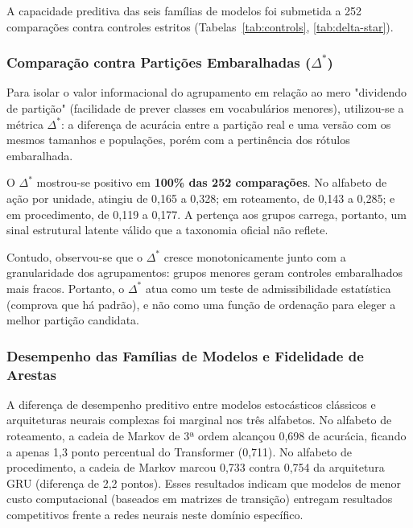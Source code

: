A capacidade preditiva das seis famílias de modelos foi submetida a 252 comparações contra controles estritos (Tabelas~\ref{tab:controls}, \ref{tab:delta-star}). 

\subsubsection{Comparação contra Partições Embaralhadas (\texorpdfstring{$\Delta^*$}{Delta*})}\label{sec:res-sinal}

Para isolar o valor informacional do agrupamento em relação ao mero "dividendo de partição" (facilidade de prever classes em vocabulários menores), utilizou-se a métrica $\Delta^*$: a diferença de acurácia entre a partição real e uma versão com os mesmos tamanhos e populações, porém com a pertinência dos rótulos embaralhada.

O $\Delta^*$ mostrou-se positivo em \textbf{100\% das 252 comparações}. No alfabeto de ação por unidade, atingiu de 0,165 a 0,328; em roteamento, de 0,143 a 0,285; e em procedimento, de 0,119 a 0,177. A pertença aos grupos carrega, portanto, um sinal estrutural latente válido que a taxonomia oficial não reflete. 




Contudo, observou-se que o $\Delta^*$ cresce monotonicamente junto com a granularidade dos agrupamentos: grupos menores geram controles embaralhados mais fracos. Portanto, o $\Delta^*$ atua como um teste de admissibilidade estatística (comprova que há padrão), e não como uma função de ordenação para eleger a melhor partição candidata.

\subsubsection{Desempenho das Famílias de Modelos e Fidelidade de Arestas}\label{sec:res-familias}

A diferença de desempenho preditivo entre modelos estocásticos clássicos e arquiteturas neurais complexas foi marginal nos três alfabetos. No alfabeto de roteamento, a cadeia de Markov de 3ª ordem alcançou 0,698 de acurácia, ficando a apenas 1,3 ponto percentual do Transformer (0,711). No alfabeto de procedimento, a cadeia de Markov marcou 0,733 contra 0,754 da arquitetura GRU (diferença de 2,2 pontos). Esses resultados indicam que modelos de menor custo computacional (baseados em matrizes de transição) entregam resultados competitivos frente a redes neurais neste domínio específico.

